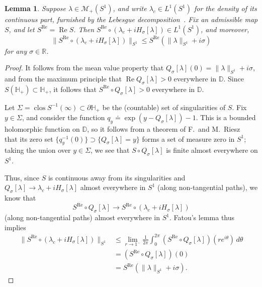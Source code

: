 \documentclass{cams-l} %
\newcommand{\dave}[1]{#1}\newcommand{\davebegin}{}\newcommand{\daveend}{}\newcommand{\george}[1]{#1}
\newcommand{\RR}{\mathbb R}
\newcommand{\HH}{\mathbb H}
\newcommand{\DD}{\mathbb D}
\newcommand{\cM}{\mathcal M}
\newcommand{\op}{\operatorname}
\renewcommand{\Re}{\op{Re}}
\newtheorem{lemma}[theorem]{Lemma}
\theoremstyle{definition}
\theoremstyle{remark}
\numberwithin{equation}{section}
\begin{document}
\begin{lemma}\label{lem:firstone}
    Suppose $\lambda\in\cM_+(S^1)$, and write $\lambda_c\in L^1(S^1)$ for the density of its continuous part, furnished by the Lebesgue decomposition~\cite{rudin1974real}. Fix an admissible map $S$, and let $S^{\Re}=\Re S$. Then $S^{\Re}\circ(\lambda_c + iH_\sigma[\lambda])\in L^1(S^1)$, and moreover,
    \begin{equation}\label{eq:L1_bound}
    \|S^{\Re}\circ(\lambda_c+iH_\sigma[\lambda])\|_{S^1}\leq S^{\Re}(\|\lambda\|_{S^1}+i\sigma)
\end{equation}
for any $\sigma\in\RR$.
\end{lemma}

\begin{proof}
    \dave{It follows from the mean value property that $Q_\sigma[\lambda](0)=\|\lambda\|_{S^1}+i\sigma$, and from the maximum principle that $\Re Q_\sigma[\lambda]>0$ everywhere in $\DD$. Since $S(\HH_+)\subset \HH_+$, it follows that $S^{\Re}\circ Q_\sigma[\lambda]>0$ everywhere in $\DD$}.

    \dave{Let $\Sigma=\op{clos}S^{-1}(\infty)\subset\partial\HH_+$ be the \dave{(countable)} set of singularities of $S$}. Fix $y\in\Sigma$, and consider the function $q_y \doteq \exp(y-Q_\sigma[\lambda])-1$. This is a bounded holomorphic function on $\DD$, so it follows from a theorem of F.~and M.~Riesz~\cite{lars1988collected,e8589594-ae28-3f64-a921-def172de1f4c} that its zero set $\{q_y^{-1}(0)\}\supset\{Q_\sigma[\lambda]=y\}$ forms a set of measure zero in $S^1$; taking the union over $y\in\Sigma$, we see that $S\circ Q_\sigma[\lambda]$ is finite almost everywhere on $S^1$.
    
    Thus, since $S$ is continuous away from its singularities and $Q_\sigma[\lambda]\to \lambda_c+iH_\sigma[\lambda]$ almost everywhere in $S^1$ (along non-tangential paths), we know that 
    \[S^{\Re}\circ Q_\sigma[\lambda]\to S^{\Re}\circ(\lambda_c+iH_\sigma[\lambda])\]
    (along non-tangential paths) almost everywhere in $S^1$. \dave{Fatou's lemma thus implies}
    \begin{align*}\|S^{\Re}\circ(\lambda_c+iH_\sigma[\lambda])\|_{S^1} &\leq \lim_{r\to 1^-}\frac{1}{2\pi}\int_0^{2\pi} (S^{\Re}\circ Q_\sigma[\lambda])(re^{i\theta})\,d\theta \\
    &= (S^{\Re}\circ Q_\sigma[\lambda])(0) \\
    &= S^{\Re}(\|\lambda\|_{S^1}+i\sigma).
    \end{align*}
\end{proof}
\end{document}

